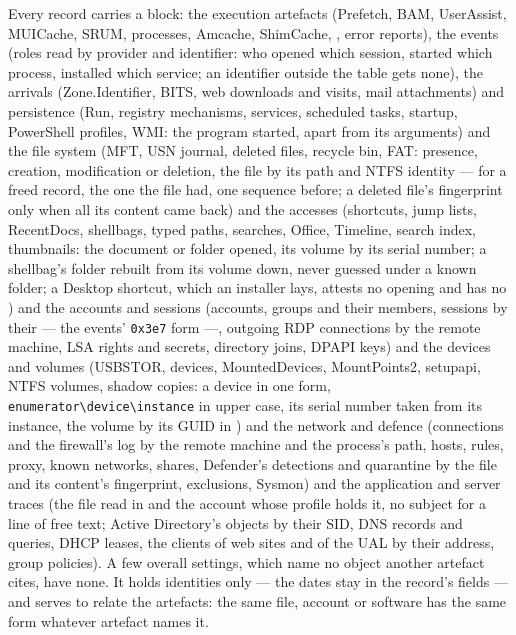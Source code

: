 \documentclass[11pt,a4paper,oneside]{report}
\begin{document}
Every record carries a  block: the execution artefacts
(Prefetch, BAM, UserAssist, MUICache, SRUM, processes, Amcache, ShimCache,
, error reports), the events (roles read by
provider and identifier: who opened which session, started which process,
installed which service; an identifier outside the table gets none), the
arrivals (Zone.Identifier, BITS, web downloads and visits, mail attachments)
and persistence (Run, registry mechanisms, services, scheduled tasks, startup,
PowerShell profiles, WMI: the program started, apart from its arguments) and
the file system (MFT, USN journal, deleted files, recycle bin, FAT: presence,
creation, modification or deletion, the file by its path and NTFS identity ---
for a freed record, the one the file had, one sequence before; a
deleted file's fingerprint only when all its content came back) and the
accesses (shortcuts, jump lists, RecentDocs, shellbags, typed paths,
searches, Office, Timeline, search index, thumbnails: the document or folder
opened, its volume by its serial number; a shellbag's folder rebuilt from its
volume down, never guessed under a known folder; a Desktop shortcut, which an
installer lays, attests no opening and has no ) and the accounts
and sessions (accounts, groups and their members, sessions by their
 --- the events' \texttt{0x3e7} form ---, outgoing RDP
connections by the remote machine, LSA rights and secrets, directory joins,
DPAPI keys) and the devices and volumes (USBSTOR, devices, MountedDevices,
MountPoints2, setupapi, NTFS volumes, shadow copies: a device in one form,
\texttt{enumerator\textbackslash device\textbackslash instance} in upper
case, its serial number taken from its instance, the volume by its GUID in
) and the network and defence (connections and the firewall's
log by the remote machine and the process's path, hosts, rules, proxy, known
networks, shares, Defender's detections and quarantine by the file and its
content's fingerprint, exclusions, Sysmon) and the application and server
traces (the file read in  and the account whose profile holds
it, no subject for a line of free text; Active Directory's objects by their
SID, DNS records and queries, DHCP leases, the clients of web sites and of
the UAL by their address, group policies). A few overall settings, which
name no object another artefact cites, have none. It holds identities only --- the dates stay in the
record's fields --- and serves to relate the artefacts: the same file, account
or software has the same form whatever artefact names it.
\end{document}
